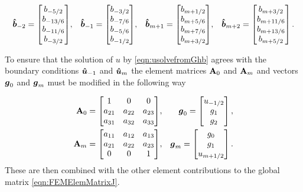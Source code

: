 \begin{align*}
\boldsymbol{\hat{b}}_{-2} = \begin{bmatrix}
b_{-5/2} \\ b_{-13/6} \\ b_{-11/6} \\ b_{-3/2}\end{bmatrix}&, &\boldsymbol{\hat{b}}_{-1} = \begin{bmatrix}
b_{-3/2} \\ b_{-7/6} \\ b_{-5/6} \\ b_{-1/2}\end{bmatrix}&, &\boldsymbol{\hat{b}}_{m+1} = \begin{bmatrix}
b_{m+1/2} \\ b_{m+5/6} \\ b_{m+7/6} \\ b_{m+3/2}\end{bmatrix}&, &\boldsymbol{\hat{b}}_{m+2} = \begin{bmatrix}
b_{m+3/2} \\ b_{m+11/6} \\ b_{m+13/6} \\ b_{m+5/2}\end{bmatrix}.
\end{align*}

To ensure that the solution of $u$ by \eqref{eqn:usolvefromGhb} agrees with the boundary conditions $\boldsymbol{\hat{u}}_{-1}$ and $\boldsymbol{\hat{u}}_{m}$ the element matrices $\mathbf{A}_0$ and $\mathbf{A}_m$ and vectors $\boldsymbol{g}_0$ and $\boldsymbol{g}_m$ must be modified in the following way 

\begin{align}
\mathbf{A}_{0} = 
\begin{bmatrix}
1 &0 &0 \\
a_{21} & a_{22} & a_{23} \\
a_{31} & a_{32} & a_{33} \\
\end{bmatrix} &,& \boldsymbol{g}_{0} = \begin{bmatrix}
u_{-1/2} \\
g_1 \\
g_2 \\
\end{bmatrix},\\
\mathbf{A}_{m} = 
\begin{bmatrix}
a_{11} & a_{12} & a_{13} \\
a_{21} & a_{22} & a_{23} \\
0 & 0 & 1 \\
\end{bmatrix} &,& \boldsymbol{g}_{m} = \begin{bmatrix}
g_0\\
g_1 \\
u_{m+1/2} \\
\end{bmatrix}.
\end{align}
These are then combined with the other element contributions to the global matrix \eqref{eqn:FEMElemMatrixJ}.


